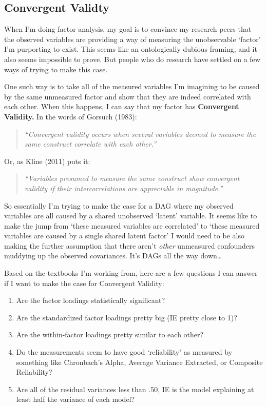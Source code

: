 \documentclass[
  letterpaper,
  DIV=11,
  numbers=noendperiod]{scrreprt}
\providecommand{\tightlist}{%
  \setlength{\itemsep}{0pt}\setlength{\parskip}{0pt}}\usepackage{longtable,booktabs,array}
\begin{document}
\hypertarget{convergent-validty}{%
\subsection{Convergent Validty}\label{convergent-validty}}

When I'm doing factor analysis, my goal is to convince my research peers
that the observed variables are providing a way of measuring the
unobservable `factor' I'm purporting to exist. This seems like an
ontologically dubious framing, and it also seems impossible to prove.
But people who do research have settled on a few ways of trying to make
this case.

One such way is to take all of the measured variables I'm imagining to
be caused by the same unmeasured factor and show that they are indeed
correlated with each other. When this happens, I can say that my factor
has \textbf{Convergent Validity.} In the words of Gorsuch (1983):

\begin{quote}
\emph{``Convergent validity occurs when several variables deemed to
measure the same construct correlate with each other.''}
\end{quote}

Or, as Kline (2011) puts it:

\begin{quote}
\emph{``Variables presumed to measure the same construct show convergent
validity if their intercorrelations are appreciable in magnitude.''}
\end{quote}

So essentially I'm trying to make the case for a DAG where my observed
variables are all caused by a shared unobserved `latent' variable. It
seems like to make the jump from `these measured variables are
correlated' to `these measured variables are caused by a single shared
latent factor' I would need to be also making the further assumption
that there aren't \emph{other} unmeasured confounders muddying up the
observed covariances. It's DAGs all the way down\ldots{}

Based on the textbooks I'm working from, here are a few questions I can
answer if I want to make the case for Convergent Validity:

\begin{enumerate}
\def\labelenumi{\arabic{enumi}.}
\tightlist
\item
  Are the factor loadings statistically significant?
\item
  Are the standardized factor loadings pretty big (IE pretty close to
  1)?
\item
  Are the within-factor loadings pretty similar to each other?
\item
  Do the measurements seem to have good `reliability' as measured by
  something like Chronbach's Alpha, Average Variance Extracted, or
  Composite Reliability?
\item
  Are all of the residual variances less than .50, IE is the model
  explaining at least half the variance of each model?
\end{enumerate}
\end{document}
